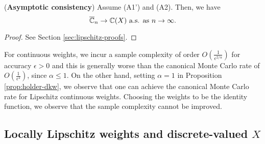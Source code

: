 \begin{proposition}(\textbf{Asymptotic consistency})
\label{prop:lipschitz}
Assume (A1') and (A2). Then, we have 
$$\overline {\mathbb{C}}_n
\rightarrow
\mathbb{C}(X)
 \text{   a.s. as } n\rightarrow \infty.
$$
\end{proposition}

\begin{proof}
See Section \ref{sec:lipschitz-proofs}.
\end{proof}

\begin{remark}
 For \holder continuous weights, we incur a sample complexity of order $O\left(\frac1{\epsilon^{2/\alpha}}\right)$ for accuracy $\epsilon>0$ and this is generally worse than the canonical Monte Carlo rate of $O\left(\frac1{\epsilon^2}\right)$, since $\alpha \le 1$. On the other hand, setting $\alpha=1$ in Proposition \ref{prop:holder-dkw}, we observe that one can achieve the canonical Monte Carlo rate for Lipschitz continuous weights. Choosing the weights to be the identity function, we observe that the sample complexity cannot be improved.
\end{remark}

\subsection{Locally Lipschitz weights and discrete-valued $X$}

